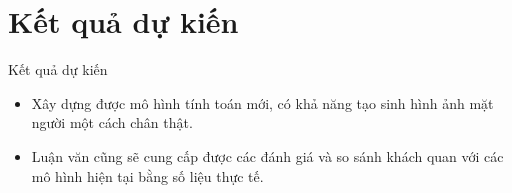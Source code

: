 \section{Kết quả dự kiến}\label{sec:intro}
\frame{\tableofcontents[currentsection]}
\begin{frame}{Kết quả dự kiến}

\begin{itemize}
    \item Xây dựng được mô hình tính toán mới, có khả năng tạo sinh hình ảnh mặt người một cách chân thật.
    \item Luận văn cũng sẽ cung cấp được các đánh giá và so sánh khách quan với các mô hình hiện tại bằng số liệu thực tế.
\end{itemize}
\end{frame}
